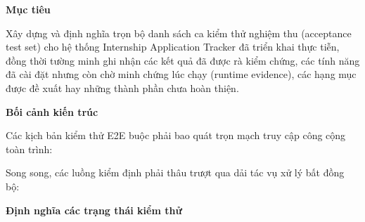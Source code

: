 \vspace{0.5em}\noindent\textbf{Mục tiêu}\par

Xây dựng và định nghĩa trọn bộ danh sách ca kiểm thử nghiệm thu
(acceptance test set) cho hệ thống Internship Application Tracker đã
triển khai thực tiễn, đồng thời tường minh ghi nhận các kết quả đã được
rà kiểm chứng, các tính năng đã cài đặt nhưng còn chờ minh chứng lúc
chạy (runtime evidence), các hạng mục được đề xuất hay những thành phần
chưa hoàn thiện.

\vspace{0.5em}\noindent\textbf{Bối cảnh kiến
trúc}\par

Các kịch bản kiểm thử E2E buộc phải bao quát trọn mạch truy cập công
cộng toàn trình:

\begin{Shaded}
\begin{Highlighting}[]
\end{Highlighting}
\end{Shaded}

Song song, các luồng kiểm định phải thâu trượt qua dải tác vụ xử lý bất
đồng bộ:

\begin{Shaded}
\begin{Highlighting}[]
\end{Highlighting}
\end{Shaded}

\vspace{0.5em}\noindent\textbf{Định nghĩa các trạng thái kiểm
thử}\par

